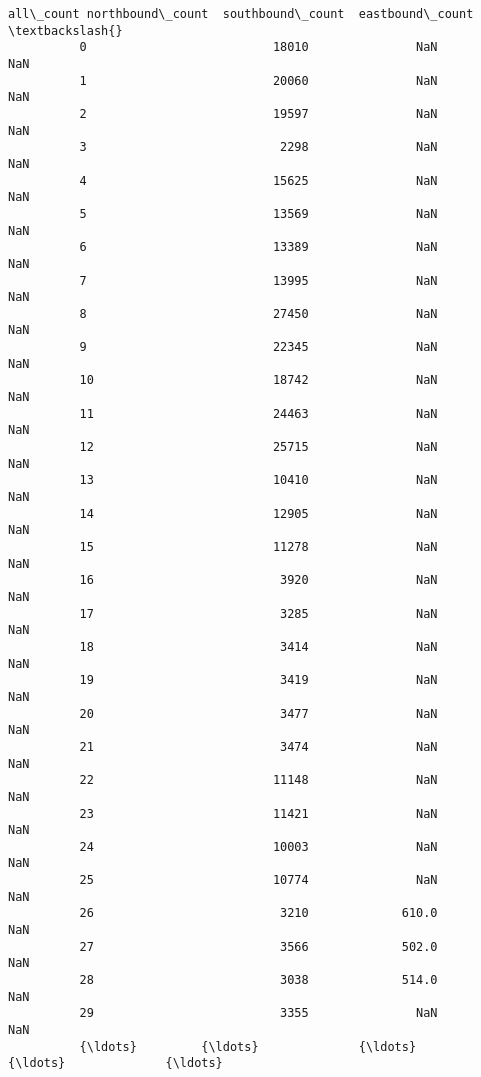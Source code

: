 \documentclass[11pt]{article}
\begin{document}
\begin{Verbatim}[commandchars=\\\{\}]
                all\_count northbound\_count  southbound\_count  eastbound\_count  \textbackslash{}
          0                          18010               NaN              NaN   
          1                          20060               NaN              NaN   
          2                          19597               NaN              NaN   
          3                           2298               NaN              NaN   
          4                          15625               NaN              NaN   
          5                          13569               NaN              NaN   
          6                          13389               NaN              NaN   
          7                          13995               NaN              NaN   
          8                          27450               NaN              NaN   
          9                          22345               NaN              NaN   
          10                         18742               NaN              NaN   
          11                         24463               NaN              NaN   
          12                         25715               NaN              NaN   
          13                         10410               NaN              NaN   
          14                         12905               NaN              NaN   
          15                         11278               NaN              NaN   
          16                          3920               NaN              NaN   
          17                          3285               NaN              NaN   
          18                          3414               NaN              NaN   
          19                          3419               NaN              NaN   
          20                          3477               NaN              NaN   
          21                          3474               NaN              NaN   
          22                         11148               NaN              NaN   
          23                         11421               NaN              NaN   
          24                         10003               NaN              NaN   
          25                         10774               NaN              NaN   
          26                          3210             610.0              NaN   
          27                          3566             502.0              NaN   
          28                          3038             514.0              NaN   
          29                          3355               NaN              NaN   
          {\ldots}         {\ldots}              {\ldots}               {\ldots}              {\ldots}   

\end{Verbatim}
\end{document}
